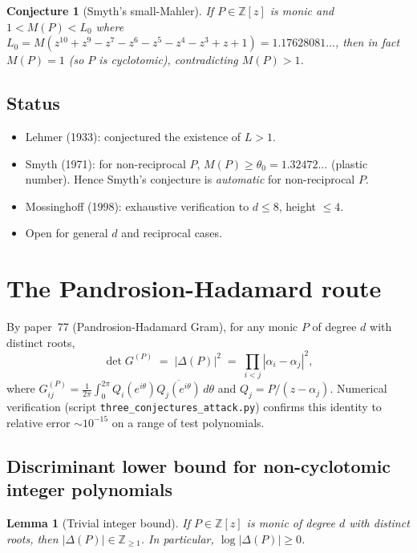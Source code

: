 \documentclass[11pt,a4paper]{article}
\newtheorem{lemma}[theorem]{Lemma}
\newtheorem{conjecture}[theorem]{Conjecture}
\begin{document}
\begin{conjecture}[Smyth's small-Mahler]\label{conj:smyth}
If $P \in \mathbb{Z}[z]$ is monic and $1 < M(P) < L_0$ where
$L_0 = M(z^{10} + z^9 - z^7 - z^6 - z^5 - z^4 - z^3 + z + 1) = 1.17628081\ldots$,
then in fact $M(P) = 1$ (so $P$ is cyclotomic), contradicting $M(P) > 1$.
\end{conjecture}

\subsection{Status}
\begin{itemize}
\item Lehmer (1933): conjectured the existence of $L > 1$.
\item Smyth (1971): for non-reciprocal $P$, $M(P) \ge \theta_0 = 1.32472\ldots$
(plastic number). Hence Smyth's conjecture is \emph{automatic} for non-reciprocal $P$.
\item Mossinghoff (1998): exhaustive verification to $d \le 8$, height $\le 4$.
\item Open for general $d$ and reciprocal cases.
\end{itemize}

\section{The Pandrosion-Hadamard route}\label{sec:reform}

By paper~77 (Pandrosion-Hadamard Gram), for any monic $P$ of degree $d$ with
distinct roots,
\[
\det G^{(P)} \;=\; |\Delta(P)|^2 \;=\; \prod_{i < j} |\alpha_i - \alpha_j|^2,
\]
where $G^{(P)}_{ij} = \frac{1}{2\pi}\int_0^{2\pi} Q_i(e^{i\theta}) \overline{Q_j(e^{i\theta})}\, d\theta$
and $Q_j = P/(z - \alpha_j)$. Numerical verification (script
\texttt{three\_conjectures\_attack.py}) confirms this identity to relative
error $\sim 10^{-15}$ on a range of test polynomials.

\subsection{Discriminant lower bound for non-cyclotomic integer polynomials}

\begin{lemma}[Trivial integer bound]\label{lem:disc-int}
If $P \in \mathbb{Z}[z]$ is monic of degree $d$ with distinct roots, then
$|\Delta(P)| \in \mathbb{Z}_{\ge 1}$. In particular, $\log|\Delta(P)| \ge 0$.
\end{lemma}
\end{document}
